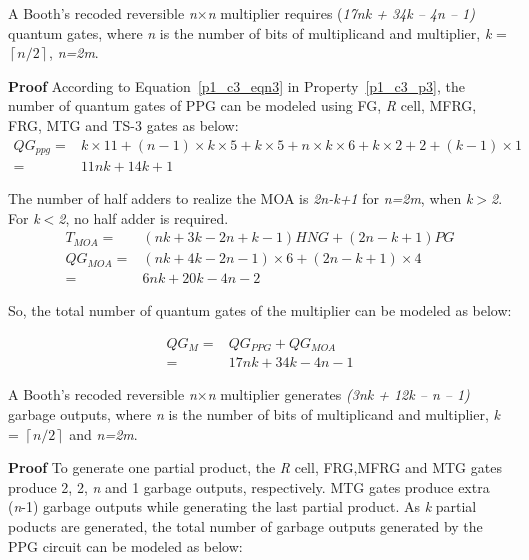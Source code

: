 \begin{property}\label{p1_c3_p5}\textnormal{
	A Booth's recoded reversible \textit{n$\times $n }multiplier requires (\textit{17nk + 34k -- 4n -- 1) }quantum gates, where \textit{n} is the number of bits of multiplicand and multiplier, \textit{k} = $\left\lceil n/2\right\rceil $, \textit{n=2m}.}
\end{property}

\noindent\textbf{Proof}
	According to Equation~\ref{p1_c3_eqn3} in Property~\ref{p1_c3_p3}, the number of quantum gates of PPG can be modeled using FG, \textit{R} cell, MFRG, FRG, MTG and TS-3 gates as below:
\begin{align*}
QG_{ppg}=& k\times 11 + (n-1) \times k\times 5 + k\times 5 + n\times k\times 6 + k\times 2 + 2 + (k-1)\times 1\\
=&11nk + 14k + 1
\end{align*}




\noindent The number of half adders to realize the MOA is \textit{2n-k+1} for \textit{n=2m}, when \textit{k$>$2}. For \textit{k$<$2}, no half adder is required. 
\begin{align*}
T_{MOA}=& (nk + 3k - 2n + k - 1)HNG + (2n - k + 1) PG\\
QG_{MOA}=& (nk + 4k - 2n - 1)\times 6+(2n - k + 1)\times 4\\
=& 6nk + 20k - 4n - 2
\end{align*}

\noindent So, the total number of quantum gates of the multiplier can be modeled as below:

\begin{align*}
QG_{M} =& QG_{PPG} + QG_{MOA}\\
=& 17nk + 34k - 4n - 1
\end{align*}
\begin{property}\textnormal{
	A Booth's recoded reversible \textit{n$\times $n }multiplier generates \textit{(3nk + 12k -- n -- 1) }garbage outputs, where \textit{n} is the number of bits of multiplicand and multiplier, \textit{k} = $\left\lceil n/2\right\rceil $ and \textit{n=2m}.}
\end{property}

\noindent\textbf{Proof}
	To generate one partial product, the \textit{R} cell, FRG,MFRG and MTG gates produce 2, 2, \textit{n} and 1 garbage outputs, respectively. MTG gates produce extra (\textit{n}-1) garbage outputs while generating the last partial product. As \textit{k} partial poducts are generated, the total number of garbage outputs generated by the PPG circuit can be modeled as below:


